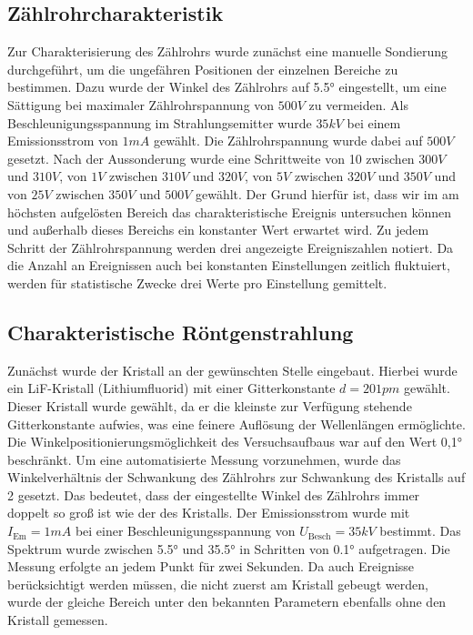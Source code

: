 \subsection{ Zählrohrcharakteristik}
Zur Charakterisierung des Zählrohrs wurde zunächst eine manuelle Sondierung durchgeführt, um die ungefähren Positionen der einzelnen Bereiche zu bestimmen. Dazu wurde der Winkel des Zählrohrs auf \ang{5.5} eingestellt, um eine Sättigung bei maximaler Zählrohrspannung von $500 \unit{V}$ zu vermeiden. Als Beschleunigungsspannung im Strahlungsemitter wurde $35 \unit{kV}$ bei einem Emissionsstrom von $1 \unit{mA}$ gewählt. Die Zählrohrspannung wurde dabei auf $500 \unit{V} $ gesetzt. Nach der Aussonderung wurde eine Schrittweite von 10 zwischen $300 \unit{V}$ und $310 \unit{V}$, von $1  \unit{V}$ zwischen $310  \unit{V}$ und $320 \unit{V}$, von $5 \unit{V}$ zwischen $320 \unit{V}$ und $350 \unit{V}$ und von $25 \unit{V}$ zwischen $350 \unit{V}$ und $500 \unit{V}$ gewählt. Der Grund hierfür ist, dass wir im am höchsten aufgelösten Bereich das charakteristische Ereignis untersuchen können und außerhalb dieses Bereichs ein konstanter Wert erwartet wird. Zu jedem Schritt der Zählrohrspannung werden drei angezeigte  Ereigniszahlen notiert. Da die Anzahl an Ereignissen auch bei konstanten Einstellungen zeitlich fluktuiert, werden für statistische Zwecke drei Werte pro Einstellung gemittelt. 

\subsection{Charakteristische Röntgenstrahlung}
Zunächst wurde der Kristall an der gewünschten Stelle eingebaut. Hierbei wurde ein LiF-Kristall (Lithiumfluorid) mit einer Gitterkonstante $d=201 \unit{pm}$ gewählt. Dieser Kristall wurde gewählt, da er die kleinste zur Verfügung stehende  Gitterkonstante aufwies, was eine feinere Auflösung der Wellenlängen ermöglichte. Die Winkelpositionierungsmöglichkeit des Versuchsaufbaus war auf den Wert \ang{0,1} beschränkt. Um eine automatisierte Messung vorzunehmen, wurde das Winkelverhältnis der Schwankung des Zählrohrs zur Schwankung des Kristalls auf 2 gesetzt. Das bedeutet, dass der eingestellte Winkel des Zählrohrs immer doppelt so groß ist wie der des Kristalls. Der Emissionsstrom wurde mit $I_\mathrm{Em}=1 \unit{mA}$ bei einer Beschleunigungsspannung von $U_\mathrm{Besch}=35 \unit{kV}$ bestimmt. Das Spektrum wurde zwischen \ang{5.5} und \ang {35.5} in Schritten von \ang{0.1} aufgetragen. Die Messung erfolgte an jedem Punkt für zwei Sekunden. Da auch Ereignisse berücksichtigt werden müssen, die nicht zuerst am Kristall gebeugt werden, wurde der gleiche Bereich unter den bekannten Parametern ebenfalls ohne den Kristall gemessen. 

